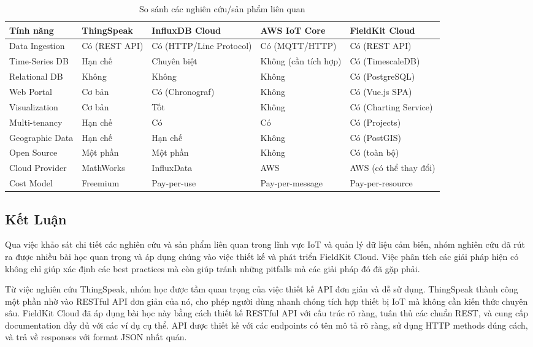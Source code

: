 \begin{table}[H]
\centering
\caption{So sánh các nghiên cứu/sản phẩm liên quan}
\label{tab:so-sanh-nghien-cuu}
\begin{tabular}{|p{2.5cm}|p{2.5cm}|p{2.5cm}|p{2.5cm}|p{2.5cm}|}
\hline
\textbf{Tính năng} & \textbf{ThingSpeak} & \textbf{InfluxDB Cloud} & \textbf{AWS IoT Core} & \textbf{FieldKit Cloud} \\
\hline
Data Ingestion & Có (REST API) & Có (HTTP/Line Protocol) & Có (MQTT/HTTP) & Có (REST API) \\
\hline
Time-Series DB & Hạn chế & Chuyên biệt & Không (cần tích hợp) & Có (TimescaleDB) \\
\hline
Relational DB & Không & Không & Không & Có (PostgreSQL) \\
\hline
Web Portal & Cơ bản & Có (Chronograf) & Không & Có (Vue.js SPA) \\
\hline
Visualization & Cơ bản & Tốt & Không & Có (Charting Service) \\
\hline
Multi-tenancy & Hạn chế & Có & Có & Có (Projects) \\
\hline
Geographic Data & Hạn chế & Hạn chế & Không & Có (PostGIS) \\
\hline
Open Source & Một phần & Một phần & Không & Có (toàn bộ) \\
\hline
Cloud Provider & MathWorks & InfluxData & AWS & AWS (có thể thay đổi) \\
\hline
Cost Model & Freemium & Pay-per-use & Pay-per-message & Pay-per-resource \\
\hline
\end{tabular}
\end{table}

\subsection{Kết Luận}

Qua việc khảo sát chi tiết các nghiên cứu và sản phẩm liên quan trong lĩnh vực IoT và quản lý dữ liệu cảm biến, nhóm nghiên cứu đã rút ra được nhiều bài học quan trọng và áp dụng chúng vào việc thiết kế và phát triển FieldKit Cloud. Việc phân tích các giải pháp hiện có không chỉ giúp xác định các best practices mà còn giúp tránh những pitfalls mà các giải pháp đó đã gặp phải.

Từ việc nghiên cứu ThingSpeak, nhóm học được tầm quan trọng của việc thiết kế API đơn giản và dễ sử dụng. ThingSpeak thành công một phần nhờ vào RESTful API đơn giản của nó, cho phép người dùng nhanh chóng tích hợp thiết bị IoT mà không cần kiến thức chuyên sâu. FieldKit Cloud đã áp dụng bài học này bằng cách thiết kế RESTful API với cấu trúc rõ ràng, tuân thủ các chuẩn REST, và cung cấp documentation đầy đủ với các ví dụ cụ thể. API được thiết kế với các endpoints có tên mô tả rõ ràng, sử dụng HTTP methods đúng cách, và trả về responses với format JSON nhất quán.

